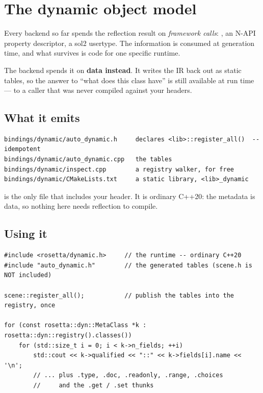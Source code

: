 \chapter{The dynamic object model}
\label{ch:dynamic}

Every backend so far spends the reflection result on \emph{framework calls}:
, an N-API property descriptor, a
sol2 usertype. The information is consumed at generation time, and what survives
is code for one specific runtime.

The  backend spends it on \textbf{data instead}. It writes the IR
back out as static tables, so the answer to ``what does this class have'' is
still available at run time --- to a caller that was never compiled against your
headers.

\section{What it emits}

\begin{lstlisting}[style=plain]
bindings/dynamic/auto_dynamic.h     declares <lib>::register_all()  -- idempotent
bindings/dynamic/auto_dynamic.cpp   the tables
bindings/dynamic/inspect.cpp        a registry walker, for free
bindings/dynamic/CMakeLists.txt     a static library, <lib>_dynamic
\end{lstlisting}

 is the only file that includes your header. It is
ordinary C++20: the metadata is data, so nothing here needs reflection to
compile.

\section{Using it}

\begin{lstlisting}[style=cpp]
#include <rosetta/dynamic.h>     // the runtime -- ordinary C++20
#include "auto_dynamic.h"        // the generated tables (scene.h is NOT included)

scene::register_all();           // publish the tables into the registry, once

for (const rosetta::dyn::MetaClass *k : rosetta::dyn::registry().classes())
    for (std::size_t i = 0; i < k->n_fields; ++i)
        std::cout << k->qualified << "::" << k->fields[i].name << '\n';
        // ... plus .type, .doc, .readonly, .range, .choices
        //     and the .get / .set thunks
\end{lstlisting}

